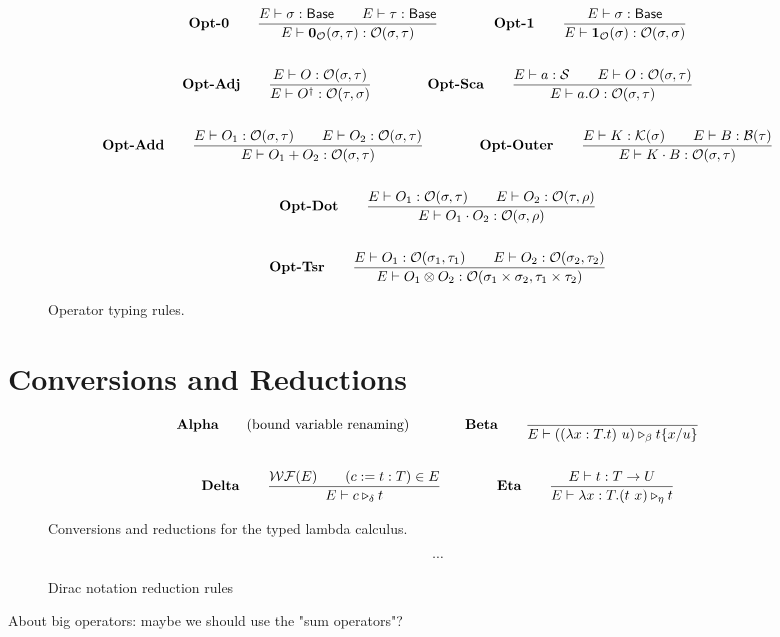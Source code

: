 \documentclass{article}
\begin{document}
\begin{figure}[h]
    \begin{gather*}
        \textbf{Opt-0} \qquad
        \frac{E \vdash \sigma : \mathsf{Base} \qquad E \vdash \tau : \mathsf{Base}}{E \vdash \mathbf{0}_\mathcal{O}(\sigma, \tau) : \mathcal{O}(\sigma, \tau)} 
        \qquad \qquad
        \textbf{Opt-1} \qquad
        \frac{E \vdash \sigma : \mathsf{Base}}{E \vdash \mathbf{1}_\mathcal{O}(\sigma) : \mathcal{O}(\sigma, \sigma)} \\
        \\
        \textbf{Opt-Adj} \qquad
        \frac{E \vdash O : \mathcal{O}(\sigma, \tau)}{E \vdash O^\dagger : \mathcal{O}(\tau, \sigma)} 
        \qquad \qquad
        \textbf{Opt-Sca} \qquad
        \frac{E \vdash a : \mathcal{S} \qquad E \vdash O : \mathcal{O}(\sigma, \tau)}{E \vdash a.O : \mathcal{O}(\sigma, \tau)} \\
        \\
        \textbf{Opt-Add} \qquad
        \frac{E \vdash O_1 : \mathcal{O}(\sigma, \tau) \qquad E \vdash O_2 : \mathcal{O}(\sigma, \tau)}{E \vdash O_1 + O_2 : \mathcal{O}(\sigma, \tau)}
        \qquad \qquad
        \textbf{Opt-Outer} \qquad
        \frac{E\vdash K : \mathcal{K}(\sigma) \qquad E\vdash B : \mathcal{B}(\tau)}{E\vdash K \cdot B : \mathcal{O}(\sigma, \tau)} \\
        \\
        \textbf{Opt-Dot} \qquad
        \frac{E \vdash O_1 : \mathcal{O}(\sigma, \tau) \qquad E \vdash O_2 : \mathcal{O}(\tau, \rho)}{E \vdash O_1 \cdot O_2 : \mathcal{O}(\sigma, \rho)} \\
        \\
        \textbf{Opt-Tsr} \qquad
        \frac{E \vdash O_1 : \mathcal{O}(\sigma_1, \tau_1) \qquad E \vdash O_2 : \mathcal{O}(\sigma_2, \tau_2)} {E \vdash O_1 \otimes O_2 : \mathcal{O}(\sigma_1 \times \sigma_2, \tau_1 \times \tau_2)}
    \end{gather*}
    \caption{Operator typing rules.}
\end{figure}

\clearpage
\section{Conversions and Reductions}
\begin{figure}[h]
    \begin{gather*}
        \textbf{Alpha} \qquad \text{(bound variable renaming)}
        \qquad \qquad
        \textbf{Beta} \qquad
        \frac{}{E \vdash ((\lambda x:T.t)\ u) \triangleright_\beta t\{x/u\}} \\
        \\
        \textbf{Delta} \qquad
        \frac{\mathcal{WF}(E) \qquad (c:=t:T) \in E}{E \vdash c \triangleright_\delta t}
        \qquad \qquad
        \textbf{Eta} \qquad
        \frac{E\vdash t : T \to U}{E \vdash \lambda x : T . (t\ x) \triangleright_\eta t}
    \end{gather*}
    \caption{Conversions and reductions for the typed lambda calculus.}
\end{figure}

\begin{figure}[h]
    \begin{gather*}
        \cdots
    \end{gather*}
    \caption{Dirac notation reduction rules}
\end{figure}

About big operators: maybe we should use the "sum operators"?

\clearpage



\end{document}
